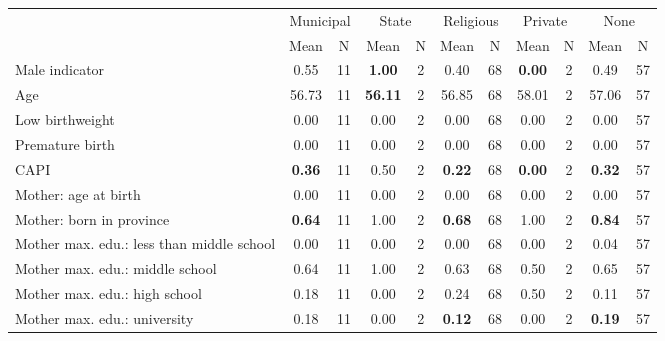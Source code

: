 \begin{tabular}{l c c c c c c c c c c}
\toprule
& \multicolumn{2}{c}{Municipal} & \multicolumn{2}{c}{State} & \multicolumn{2}{c}{Religious} & \multicolumn{2}{c}{Private} & \multicolumn{2}{c}{None} \\
& \scriptsize Mean & \scriptsize N & \scriptsize Mean & \scriptsize N & \scriptsize Mean & \scriptsize N & \scriptsize Mean & \scriptsize N & \scriptsize Mean & \scriptsize N \\
\midrule
Male indicator &      0.55 &        11 & \textbf{     1.00} &         2 &      0.40 &        68 & \textbf{     0.00} &         2 &      0.49 &        57 \\
Age &     56.73 &        11 & \textbf{    56.11} &         2 &     56.85 &        68 &     58.01 &         2 &     57.06 &        57 \\
Low birthweight &      0.00 &        11 &      0.00 &         2 &      0.00 &        68 &      0.00 &         2 &      0.00 &        57 \\
Premature birth &      0.00 &        11 &      0.00 &         2 &      0.00 &        68 &      0.00 &         2 &      0.00 &        57 \\
CAPI & \textbf{     0.36} &        11 &      0.50 &         2 & \textbf{     0.22} &        68 & \textbf{     0.00} &         2 & \textbf{     0.32} &        57 \\
Mother: age at birth &      0.00 &        11 &      0.00 &         2 &      0.00 &        68 &      0.00 &         2 &      0.00 &        57 \\
Mother: born in province & \textbf{     0.64} &        11 &      1.00 &         2 & \textbf{     0.68} &        68 &      1.00 &         2 & \textbf{     0.84} &        57 \\
Mother max. edu.: less than middle school &      0.00 &        11 &      0.00 &         2 &      0.00 &        68 &      0.00 &         2 &      0.04 &        57 \\
Mother max. edu.: middle school &      0.64 &        11 &      1.00 &         2 &      0.63 &        68 &      0.50 &         2 &      0.65 &        57 \\
Mother max. edu.: high school &      0.18 &        11 &      0.00 &         2 &      0.24 &        68 &      0.50 &         2 &      0.11 &        57 \\
Mother max. edu.: university &      0.18 &        11 &      0.00 &         2 & \textbf{     0.12} &        68 &      0.00 &         2 & \textbf{     0.19} &        57 \\

\end{tabular}
